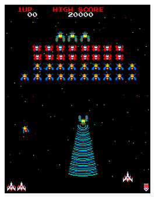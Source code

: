 \documentclass[12pt,a4paper]{report}
\begin{document}
\begin{figure}[bt]
\begin{subfigure}{.32\textwidth}
  \centering
  \includegraphics[width=.95\linewidth]{snapshot1}
  \caption{}
  \label{fig:snap1}
\end{subfigure}%
\begin{subfigure}{.32\textwidth}
  \centering

\end{subfigure}
\end{figure}
\end{document}
